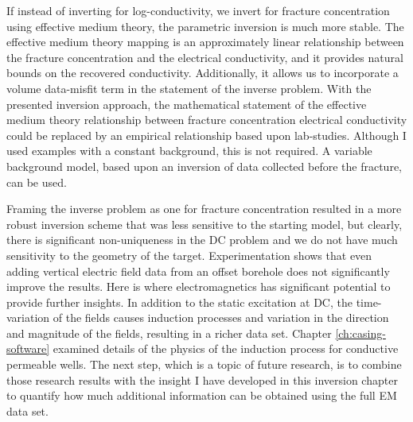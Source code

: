 If instead of inverting for log-conductivity, we invert for fracture concentration using effective medium theory, the parametric inversion is much more stable. The effective medium theory mapping is an approximately linear relationship between the fracture concentration and the electrical conductivity, and it provides natural bounds on the recovered conductivity. Additionally, it allows us to incorporate a volume data-misfit term in the statement of the inverse problem. With the presented inversion approach, the mathematical statement of the effective medium theory relationship between fracture concentration electrical conductivity could be replaced by an empirical relationship based upon lab-studies. Although I used examples with a constant background, this is not required. A variable background model, based upon an inversion of data collected before the fracture, can be used.

Framing the inverse problem as one for fracture concentration resulted in a more robust inversion scheme that was less sensitive to the starting model, but clearly, there is significant non-uniqueness in the DC problem and we do not have much sensitivity to the geometry of the target. Experimentation shows that even adding vertical electric field data from an offset borehole does not significantly improve the results. Here is where electromagnetics has significant potential to provide further insights. In addition to the static excitation at DC, the time-variation of the fields causes induction processes and variation in the direction and magnitude of the fields, resulting in a richer data set. Chapter \ref{ch:casing-software} examined details of the physics of the induction process for conductive permeable wells. The next step, which is a topic of future research, is to combine those research results with the insight I have developed in this inversion chapter to quantify how much additional information can be obtained using the full EM data set.
